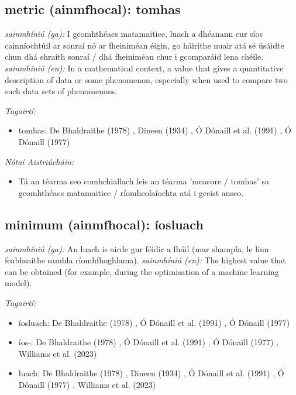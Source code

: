 \documentclass{article}
\begin{document}
\subsection*{metric (ainmfhocal): tomhas} 
 \noindent \textit{sainmhíniú (ga):} I gcomhthéacs matamaitice, luach a dhéanann cur síos cainníochtúil ar sonraí nó ar fheiniméan éigin, go háirithe nuair atá sé úsáidte chun dhá shraith sonraí / dhá fheiniméan chur i gcomparáid lena chéile.
\newline\newline
 \noindent \textit{sainmhíniú (en):} In a mathematical context, a value that gives a quantitative description of data or some phenomenon, especially when used to compare two such data sets of phenomenons.
\newline

 \noindent \textit{Tagairtí:}
\begin{itemize}
	\item tomhas: De Bhaldraithe (1978) \cite{de-bhaldraithe}, Dineen (1934) \cite{dineen}, Ó Dónaill et al. (1991) \cite{focloir-beag}, Ó Dónaill (1977) \cite{odonaill}
\end{itemize}

 \noindent \textit{Nótaí Aistriúcháin:}
\begin{itemize}
	\item Tá an téarma seo comhchiallach leis an téarma 'measure / tomhas' sa gcomhthéacs matamaitice / ríomheolaíochta atá i gceist anseo.
\end{itemize}


\subsection*{minimum (ainmfhocal): íosluach} 
 \noindent \textit{sainmhíniú (ga):} An luach is airde gur féidir a fháil (mar shampla, le linn feabhsaithe samhla ríomhfhoghlama).
\newline\newline
 \noindent \textit{sainmhíniú (en):} The highest value that can be obtained (for example, during the optimisation of a machine learning model).
\newline

 \noindent \textit{Tagairtí:}
\begin{itemize}
	\item íosluach: De Bhaldraithe (1978) \cite{de-bhaldraithe}, Ó Dónaill et al. (1991) \cite{focloir-beag}, Ó Dónaill (1977) \cite{odonaill}
	\item íos-: De Bhaldraithe (1978) \cite{de-bhaldraithe}, Ó Dónaill et al. (1991) \cite{focloir-beag}, Ó Dónaill (1977) \cite{odonaill}, Williams et al. (2023) \cite{storchiste}
	\item luach: De Bhaldraithe (1978) \cite{de-bhaldraithe}, Dineen (1934) \cite{dineen}, Ó Dónaill et al. (1991) \cite{focloir-beag}, Ó Dónaill (1977) \cite{odonaill}, Williams et al. (2023) \cite{storchiste}
\end{itemize}
\end{document}
